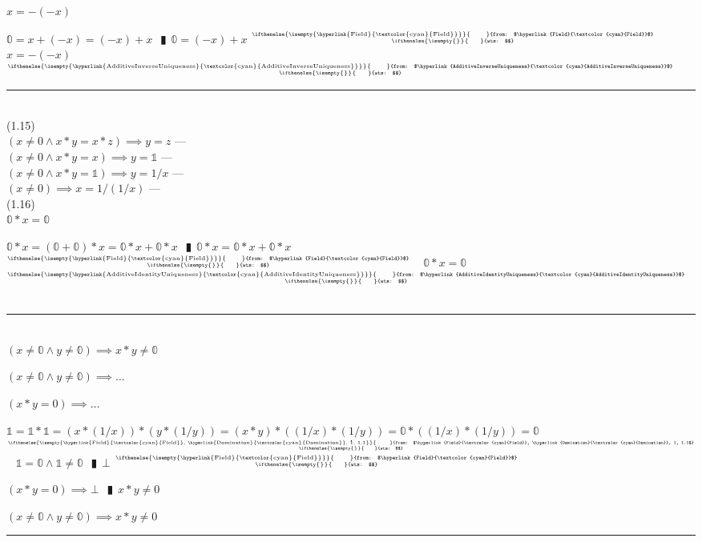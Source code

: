 \documentclass{book}
\newcommand{\wff}[1]{\hypertarget{#1}{\fbox{\textcolor{red}{$#1$}}\phantom{--}}}
\newcommand{\rf}[1]{\hyperlink{#1}{\textcolor{cyan}{#1}}}
\newcommand{\pipe}{$\phantom{(}\vrectangleblack\phantom{)}$}
\newcommand{\pr}[1]{\left(#1\right)}
\newcommand{\ann}[2]{%
  \hfill %
  $\stackrel%
  {\hbox{\tiny{\ifthenelse{\isempty{#1}}%
    {\phantom{from}}%
    {from: $#1$}}}}%
  {\hbox{\tiny{\ifthenelse{\isempty{#2}}%
    {\phantom{wts}}%
    {wts: $#2$}}}}$%
\ }
\begin{document}
\wff{DoubleNegative} $x = -(-x)$
\begin{enumerate}
  \lit $\mathbb{0} = x + (-x) = (-x) + x$ \pipe $\mathbb{0} = (-x) + x$    \ann{\rf{Field}}{}
  \lit $x = -(-x)$    \ann{\rf{AdditiveInverseUniqueness}}{}
\end{enumerate} \vspace{.75mm} \hrule \vspace{.75mm} \ \\

(1.15) \\
\wff{MultiplicativeCancellation} $(x \neq 0 \land x * y = x * z) \implies y = z$    \phantom{TODO}--- \\

\wff{MultiplicativeIdentityUniqueness} $(x \neq 0 \land x * y = x) \implies y = \mathbb{1}$    \phantom{TODO}--- \\

\wff{MultiplicativeInverseUniqueness} $(x \neq 0 \land x * y = \mathbb{1}) \implies y = 1/x$    \phantom{TODO}--- \\

\wff{DoubleReciprocal} $(x \neq 0) \implies x = 1/(1/x)$    \phantom{TODO}--- \\

(1.16) \\
\wff{Domination} $\mathbb{0} * x = \mathbb{0}$
\begin{enumerate}
  \lit $\mathbb{0} * x = (\mathbb{0} + \mathbb{0}) * x = \mathbb{0} * x + \mathbb{0} * x$ \pipe $\mathbb{0} * x =  \mathbb{0} * x + \mathbb{0} * x$    \ann{\rf{Field}}{}
  \lit $\mathbb{0} * x = \mathbb{0}$    \ann{\rf{AdditiveIdentityUniqueness}}{}
\end{enumerate} \vspace{.75mm} \hrule \vspace{.75mm} \ \\

\wff{NonDomination} $(x \neq \mathbb{0} \land y \neq \mathbb{0}) \implies x * y \neq \mathbb{0}$
\begin{enumerate}
  \lit $(x \neq \mathbb{0} \land y \neq \mathbb{0}) \implies \ldots$
  \begin{enumerate}
    \lit $(x * y = 0) \implies \ldots$
    \begin{enumerate}
      \lit $\mathbb{1} = \mathbb{1} * \mathbb{1} = \pr{x * (1/x)} * \pr{y * (1/y)} = (x * y) * \pr{(1/x) * (1/y)} = \mathbb{0} * \pr{(1/x) * (1/y)} = \mathbb{0}$    \ann{\rf{Field}, \rf{Domination}, 1, 1.1}{}
      \lit $\mathbb{1} = \mathbb{0} \land \mathbb{1} \neq \mathbb{0}$ \pipe $\bot$    \ann{\rf{Field}}{}
    \end{enumerate}
  \lit $(x * y = 0) \implies \bot$ \pipe $x * y \neq 0$
  \end{enumerate}
  \lit $(x \neq \mathbb{0} \land y \neq \mathbb{0}) \implies x * y \neq 0$
\end{enumerate} \vspace{.75mm} \hrule \vspace{.75mm} \ \\
\end{document}
